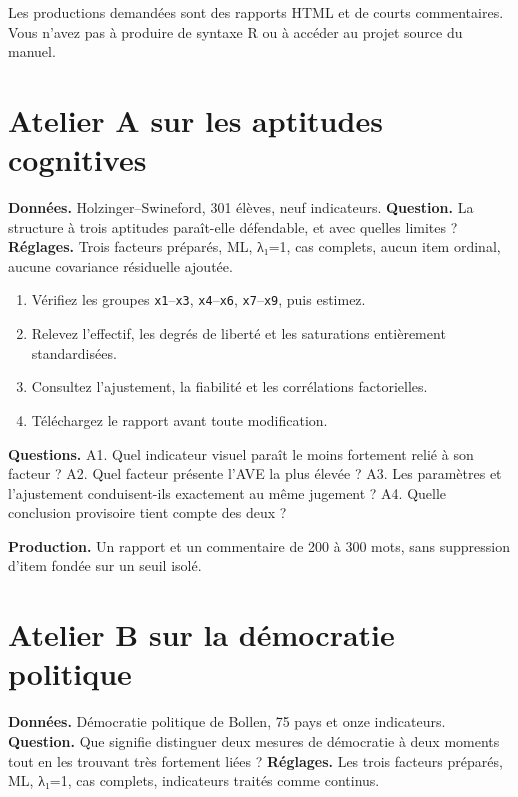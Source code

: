 \documentclass[
  french,
  11pt,
  a4paper,
  DIV=11,
  numbers=noendperiod]{scrreprt}
\providecommand{\tightlist}{%
  \setlength{\itemsep}{0pt}\setlength{\parskip}{0pt}}
\begin{document}
Les productions demandées sont des rapports HTML et de courts
commentaires. Vous n'avez pas à produire de syntaxe R ou à accéder au
projet source du manuel.

\section{Atelier A sur les aptitudes
cognitives}\label{atelier-a-sur-les-aptitudes-cognitives}

\textbf{Données.} Holzinger--Swineford, 301 élèves, neuf indicateurs.
\textbf{Question.} La structure à trois aptitudes paraît-elle
défendable, et avec quelles limites ? \textbf{Réglages.} Trois facteurs
préparés, ML, λ₁=1, cas complets, aucun item ordinal, aucune covariance
résiduelle ajoutée.

\begin{enumerate}
\def\labelenumi{\arabic{enumi}.}
\tightlist
\item
  Vérifiez les groupes \texttt{x1}--\texttt{x3},
  \texttt{x4}--\texttt{x6}, \texttt{x7}--\texttt{x9}, puis estimez.
\item
  Relevez l'effectif, les degrés de liberté et les saturations
  entièrement standardisées.
\item
  Consultez l'ajustement, la fiabilité et les corrélations factorielles.
\item
  Téléchargez le rapport avant toute modification.
\end{enumerate}

\textbf{Questions.} A1. Quel indicateur visuel paraît le moins fortement
relié à son facteur ? A2. Quel facteur présente l'AVE la plus élevée ?
A3. Les paramètres et l'ajustement conduisent-ils exactement au même
jugement ? A4. Quelle conclusion provisoire tient compte des deux ?

\textbf{Production.} Un rapport et un commentaire de 200 à 300 mots,
sans suppression d'item fondée sur un seuil isolé.

\section{Atelier B sur la démocratie
politique}\label{atelier-b-sur-la-duxe9mocratie-politique}

\textbf{Données.} Démocratie politique de Bollen, 75 pays et onze
indicateurs. \textbf{Question.} Que signifie distinguer deux mesures de
démocratie à deux moments tout en les trouvant très fortement liées ?
\textbf{Réglages.} Les trois facteurs préparés, ML, λ₁=1, cas complets,
indicateurs traités comme continus.
\end{document}
